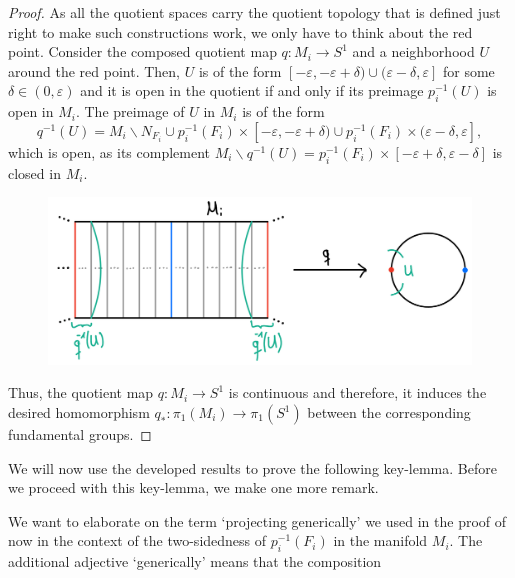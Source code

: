 \begin{proof}
    \noindent
    As all the quotient spaces carry the quotient topology that is defined just right to make such constructions work, we only have to think about the red point.
    Consider the composed quotient map \(q : M_i \to S^1\) and a neighborhood \(U\) around the red point.
    Then, \(U\) is of the form \([-\varepsilon, -\varepsilon + \delta) \cup (\varepsilon - \delta, \varepsilon]\) for some \(\delta \in (0, \varepsilon)\) and it is open in the quotient if and only if its preimage \(p_i^{-1}(U)\) is open in \(M_i\).
    The preimage of \(U\) in \(M_i\) is of the form
    \[q^{-1}(U) = M_i \backslash N_{F_i} \cup p_i^{-1}(F_i) \times [-\varepsilon, -\varepsilon + \delta) \cup p_i^{-1}(F_i) \times (\varepsilon - \delta, \varepsilon],\]
    which is open, as its complement \(M_i \backslash q^{-1}(U) = p_i^{-1}(F_i) \times [-\varepsilon + \delta, \varepsilon - \delta]\) is closed in \(M_i\).
    \begin{figure}[h!]
        \label{img:quotientnbhd}
        \centering
        \includegraphics[width=.5\textwidth]{gfx/Quotient neighborhood .png}
    \end{figure}\vspace*{-2\parskip}

    \noindent
    Thus, the quotient map \(q : M_i \to S^1\) is continuous and therefore, it induces the desired homomorphism \(q_* : \pi_1(M_i) \to \pi_1(S^1)\) between the corresponding fundamental groups.
\end{proof}

We will now use the developed results to prove the following key-lemma.
Before we proceed with this key-lemma, we make one more remark.

\begin{remark} %
    We want to elaborate on the term `projecting generically' we used in the proof of  now in the context of the two-sidedness of \(p_i^{-1}(F_i)\) in the manifold \(M_i\).
    The additional adjective `generically' means that the composition
\end{remark}

